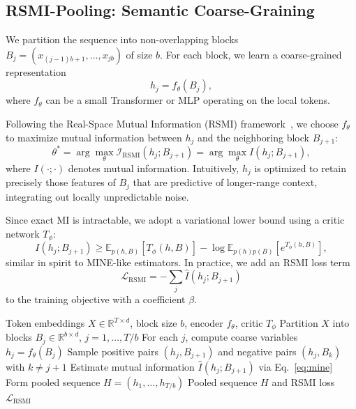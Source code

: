 \documentclass{article}
\newcommand{\RSMI}{\mathcal{I}_{\text{RSMI}}}
\begin{document}
\subsection{RSMI-Pooling: Semantic Coarse-Graining}

We partition the sequence into non-overlapping blocks $B_j = (x_{(j-1)b+1}, \dots, x_{jb})$ of size $b$. For each block, we learn a coarse-grained representation
\begin{equation}
    h_j = f_\theta(B_j),
\end{equation}
where $f_\theta$ can be a small Transformer or MLP operating on the local tokens.

Following the Real-Space Mutual Information (RSMI) framework~\cite{koch2018mutual}, we choose $f_\theta$ to maximize mutual information between $h_j$ and the neighboring block $B_{j+1}$:
\begin{equation}
    \theta^* = 
    \arg\max_\theta \RSMI(h_j; B_{j+1})
    = \arg\max_\theta I(h_j; B_{j+1}),
\end{equation}
where $I(\cdot;\cdot)$ denotes mutual information. Intuitively, $h_j$ is optimized to retain precisely those features of $B_j$ that are predictive of longer-range context, integrating out locally unpredictable noise.

Since exact MI is intractable, we adopt a variational lower bound using a critic network $T_\phi$:
\begin{equation}
    I(h_j; B_{j+1}) \geq 
    \mathbb{E}_{p(h,B)}[T_\phi(h,B)] -
    \log \mathbb{E}_{p(h)p(B)}[e^{T_\phi(h,B)}],
    \label{eq:mine}
\end{equation}
similar in spirit to MINE-like estimators. In practice, we add an RSMI loss term
\begin{equation}
    \mathcal{L}_{\text{RSMI}} = - \sum_j \hat{I}(h_j; B_{j+1})
\end{equation}
to the training objective with a coefficient $\beta$.

\begin{algorithm}[t]
\caption{RSMI-Pooling Layer (One Step)}
\label{alg:rsmi}
\begin{algorithmic}[1]
\REQUIRE Token embeddings $X \in \mathbb{R}^{T \times d}$, block size $b$, encoder $f_\theta$, critic $T_\phi$
\STATE Partition $X$ into blocks $B_j \in \mathbb{R}^{b \times d}$, $j = 1, \dots, T/b$
\STATE For each $j$, compute coarse variables $h_j = f_\theta(B_j)$
\STATE Sample positive pairs $(h_j, B_{j+1})$ and negative pairs $(h_j, B_{k})$ with $k \neq j+1$
\STATE Estimate mutual information $\hat{I}(h_j; B_{j+1})$ via Eq.~\eqref{eq:mine}
\STATE Form pooled sequence $H = (h_1, \dots, h_{T/b})$
\RETURN Pooled sequence $H$ and RSMI loss $\mathcal{L}_{\text{RSMI}}$
\end{algorithmic}
\end{algorithm}
\end{document}
